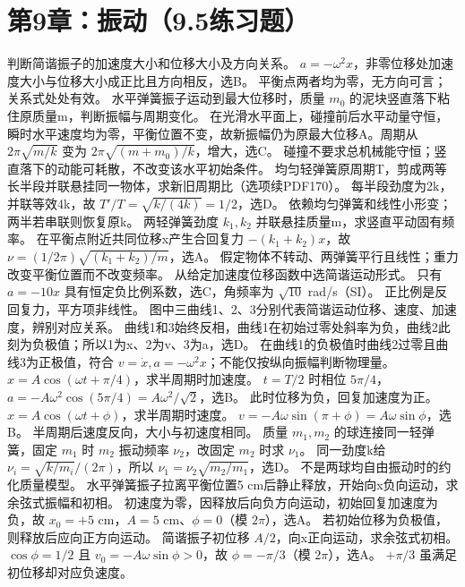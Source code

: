 \section{第9章：振动（9.5练习题）}
\problemtext 判断简谐振子的加速度大小和位移大小及方向关系。
\workings $a=-\omega^2x$，非零位移处加速度大小与位移大小成正比且方向相反，选B。
\crosscheck 平衡点两者均为零，无方向可言；关系式处处有效。
\problemtext 水平弹簧振子运动到最大位移时，质量 $m_0$ 的泥块竖直落下粘住原质量m，判断振幅与周期变化。
\workings 在光滑水平面上，碰撞前后水平动量守恒，瞬时水平速度均为零，平衡位置不变，故新振幅仍为原最大位移A。周期从 $2\pi\sqrt{m/k}$ 变为 $2\pi\sqrt{(m+m_0)/k}$，增大，选C。
\crosscheck 碰撞不要求总机械能守恒；竖直落下的动能可耗散，不改变该水平初始条件。
\problemtext 均匀轻弹簧原周期T，剪成两等长半段并联悬挂同一物体，求新旧周期比（选项续PDF170）。
\workings 每半段劲度为2k，并联等效4k，故 $T'/T=\sqrt{k/(4k)}=1/2$，选D。
\crosscheck 依赖均匀弹簧和线性小形变；两半若串联则恢复原k。
\problemtext 两轻弹簧劲度 $k_1,k_2$ 并联悬挂质量m，求竖直平动固有频率。
\workings 在平衡点附近共同位移x产生合回复力 $-(k_1+k_2)x$，故 $\nu=(1/2\pi)\sqrt{(k_1+k_2)/m}$，选A。
\crosscheck 假定物体不转动、两弹簧平行且线性；重力改变平衡位置而不改变频率。
\problemtext 从给定加速度位移函数中选简谐运动形式。
\workings 只有 $a=-10x$ 具有恒定负比例系数，选C，角频率为 $\sqrt{10}$ rad/s（SI）。
\crosscheck 正比例是反回复力，平方项非线性。
\problemtext 图中三曲线1、2、3分别代表简谐运动位移、速度、加速度，辨别对应关系。
\workings 曲线1和3始终反相，曲线1在初始过零处斜率为负，曲线2此刻为负极值；所以1为x、2为v、3为a，选D。
\crosscheck 在曲线1的负极值时曲线2过零且曲线3为正极值，符合 $v=\dot x,a=-\omega^2x$；不能仅按纵向振幅判断物理量。
\problemtext $x=A\cos(\omega t+\pi/4)$，求半周期时加速度。
\workings $t=T/2$ 时相位 $5\pi/4$，$a=-A\omega^2\cos(5\pi/4)=A\omega^2/\sqrt2$，选B。
\crosscheck 此时位移为负，回复加速度为正。
\problemtext $x=A\cos(\omega t+\phi)$，求半周期时速度。
\workings $v=-A\omega\sin(\pi+\phi)=A\omega\sin\phi$，选B。
\crosscheck 半周期后速度反向，大小与初速度相同。
\problemtext 质量 $m_1,m_2$ 的球连接同一轻弹簧，固定 $m_1$ 时 $m_2$ 振动频率 $\nu_2$，改固定 $m_2$ 时求 $\nu_1$。
\workings 同一劲度k给 $\nu_i=\sqrt{k/m_i}/(2\pi)$，所以 $\nu_1=\nu_2\sqrt{m_2/m_1}$，选D。
\crosscheck 不是两球均自由振动时的约化质量模型。
\problemtext 水平弹簧振子拉离平衡位置5 cm后静止释放，开始向x负向运动，求余弦式振幅和初相。
\workings 初速度为零，因释放后向负方向运动，初始回复加速度为负，故 $x_0=+5$ cm，$A=5$ cm、$\phi=0$（模 $2\pi$），选A。
\crosscheck 若初始位移为负极值，则释放后应向正方向运动。
\problemtext 简谐振子初位移 $A/2$，向x正向运动，求余弦式初相。
\workings $\cos\phi=1/2$ 且 $v_0=-A\omega\sin\phi>0$，故 $\phi=-\pi/3$（模 $2\pi$），选A。
\crosscheck $+\pi/3$ 虽满足初位移却对应负速度。

